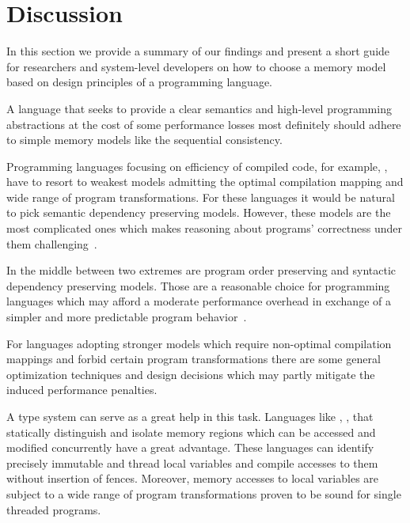 \section{Discussion}
\label{sec:discussion}

In this section we provide a summary of our findings
and present a short guide for researchers and system-level developers 
on how to choose a memory model based on 
design principles of a programming language.   

A language that seeks to provide a clear semantics and 
high-level programming abstractions at the cost 
of some performance losses most definitely should 
adhere to simple memory models like the sequential consistency. 

Programming languages focusing on efficiency 
of compiled code, for example, \CPP, 
have to resort to weakest models admitting 
the optimal compilation mapping 
and wide range of program transformations. 
For these languages it would be natural 
to pick semantic dependency preserving models.
However, these models are the most complicated ones
which makes reasoning about programs' correctness
under them challenging~\cite{Svendsen-al:ESOP18}.

In the middle between two extremes are program order preserving and 
syntactic dependency preserving models.
Those are a reasonable choice for programming languages
which may afford a moderate performance overhead 
in exchange of a simpler and more predictable program behavior~\cite{Ou-Demsky:OOPSLA18}.

For languages adopting stronger models which require non-optimal
compilation mappings and forbid certain program transformations
there are some general optimization techniques and design decisions
which may partly mitigate the induced performance penalties.

A type system can serve as a great help in this task. 
Languages like \Haskell, \OCaml, \Rust that 
statically distinguish and isolate memory regions 
which can be accessed and modified concurrently have a great advantage.
These languages can identify precisely 
immutable and thread local variables
and compile accesses to them without insertion of fences.
Moreover, memory accesses to local variables are subject to 
a wide range of program transformations proven to be
sound for single threaded programs. 
 

